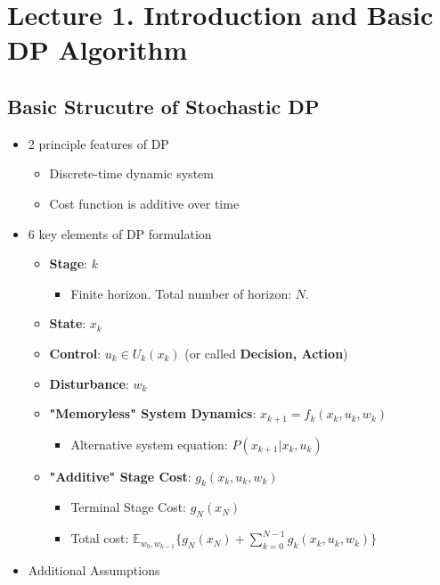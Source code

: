 \section{Lecture 1. Introduction and Basic DP Algorithm}
\subsection{Basic Strucutre of Stochastic DP}
\begin{itemize}
    \item 2 principle features of DP
        \begin{itemize}
            \item Discrete-time dynamic system
            \item Cost function is additive over time
        \end{itemize}
    \item 6 key elements of DP formulation
        \begin{itemize}
            \item \textbf{Stage}: $k$
            \begin{itemize}
                \item Finite horizon. Total number of horizon: $N$.
            \end{itemize}
            \item \textbf{State}: $x_k$
            \item \textbf{Control}: $u_k\in U_k(x_k)$ (or called \textbf{Decision, Action})
            \item \textbf{Disturbance}: $w_k$
            \item \textbf{"Memoryless" System Dynamics}: $x_{k+1}=f_k(x_k,u_k,w_k)$
                \begin{itemize}
                    \item Alternative system equation: $P(x_{k+1}|x_k,u_k)$
                \end{itemize}
            \item \textbf{"Additive" Stage Cost}: $g_k(x_k,u_k,w_k)$
                \begin{itemize}
                    \item Terminal Stage Cost: $g_N(x_N)$
                    \item Total cost: $\mathbb{E}_{w_0,w_{k-1}}\{g_N(x_N)+\sum_{k=0}^{N-1}g_k(x_k,u_k,w_k)\}$
                \end{itemize}
        \end{itemize}
    \item Additional Assumptions

\end{itemize}
